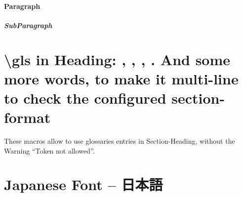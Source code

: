 \paragraph{Paragraph}

\subparagraph{SubParagraph}





\section{\textbackslash gls{} in Heading: , , , . And some more words, to make it multi-line to check the configured section-format}
These macros allow to use glossaries entries in Section-Heading, without the Warning \enquote{Token not allowed}.





\section{Japanese Font -- 日本語}

